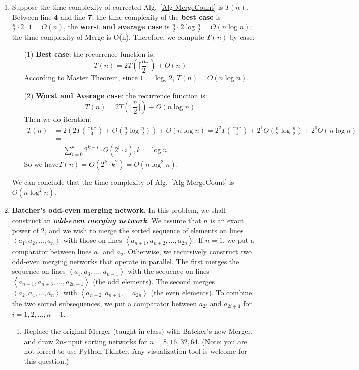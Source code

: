 \documentclass[12pt,a4paper,UTF8]{article}
\makeatletter
\newtheorem*{solution}{Solution}
\theoremstyle{definition}
\renewenvironment{solution}[1][Solution] {\par\pushQED{\qed}\normalfont\topsep6\p@\@plus6\p@\relax\trivlist\item[\hskip\labelsep\bfseries#1\@addpunct{.}]\ignorespaces}{\popQED\endtrivlist\@endpefalse} \makeatother
\makeatother
\begin{document}
\begin{enumerate}
\begin{solution}
    	Suppose the time complexity of corrected Alg.~\ref{Alg-MergeCount} is $ T(n) $.\\
    	Between line \textbf{4} and line \textbf{7}, the time complexity of the \textbf{best case} is $ \frac{n}{2}\cdot2\cdot1 = O(n)$, the \textbf{worst and average case} is $ \frac{n}{2}\cdot2\log\frac{n}{2} = O(n\log n) $; the time complexity of Merge is O(n). Therefore, we compute $ T(n) $ by case:
    	\begin{enumerate}
    		\item[(1)] \textbf{Best case}: the recurrence function is:
    		$$T(n) = 2T(\lceil \frac{n}{2} \rceil) + O(n)$$
    		According to Master Theorem, since $ 1 = \log_2 2 $, $ T(n) = O(n\log n) $.
    		\item[(2)] \textbf{Worst and Average case}: the recurrence function is:
    		$$T(n) = 2T(\lceil \frac{n}{2} \rceil) + O(n\log n)$$
    		Then we do iteration:
    		\begin{align*}
    		T(n) &= 2(2T(\lceil \frac{n}{4} \rceil) + O(\frac{n}{2}\log \frac{n}{2})) + O(n\log n) = 2^2T(\lceil \frac{n}{4} \rceil) + 2^1O(\frac{n}{2}\log \frac{n}{2}) + 2^0O(n\log n)\\
    		&= \cdots\\
    		&= \sum_{i = 0}^{k} 2^{k-i}\cdot O(2^i\cdot i), k = \log n
    		\end{align*}
    		So we have$ T(n) = O(2^k\cdot k^2) = O(n\log^2 n) $.
    	\end{enumerate}
    	We can conclude that the time complexity of Alg.~\ref{Alg-MergeCount} is $ O(n\log^2 n) $.
    \end{solution}

    \item
    \textbf{Batcher's odd-even merging network.} In this problem, we shall construct an \textbf{\textit{odd-even merging network}}. We assume that $n$ is an exact power of $2$, and we wish to merge the sorted sequence of elements on lines $\left\langle a_{1}, a_{2}, \ldots, a_{n}\right\rangle$ with those on lines $\left\langle a_{n+1}, a_{n+2}, \ldots, a_{2n}\right\rangle .$ If $n=1$, we put a comparator between lines $a_{1}$ and $a_{2}$. Otherwise, we recursively construct two odd-even merging networks that operate in parallel. The first merges the sequence on lines $\left\langle a_{1}, a_{3}, \ldots, a_{n-1}\right\rangle$ with the sequence on lines $\left\langle a_{n+1}, a_{n+3}, \ldots, a_{2n-1}\right\rangle$ (the
    odd elements). The second merges $\left\langle a_{2}, a_{4}, \ldots, a_{n}\right\rangle$ with $\left\langle a_{n+2}, a_{n+4}, \ldots\right.$
    $\left.a_{2n}\right\rangle$ (the even elements). To combine the two sorted subsequences, we put a comparator between $a_{2i}$ and $a_{2i+1}$ for $i=1,2, \ldots, n-1$.
    \begin{enumerate}
    	\item Replace the original Merger (taught in class) with Batcher's new Merger, and draw $2n$-input sorting networks for $n=8, 16, 32, 64$. {\color{blue}(Note: you are not forced to use Python Tkinter. Any visualization tool is welcome for this question.)}
    	

\end{enumerate}
\end{enumerate}
\end{document}
